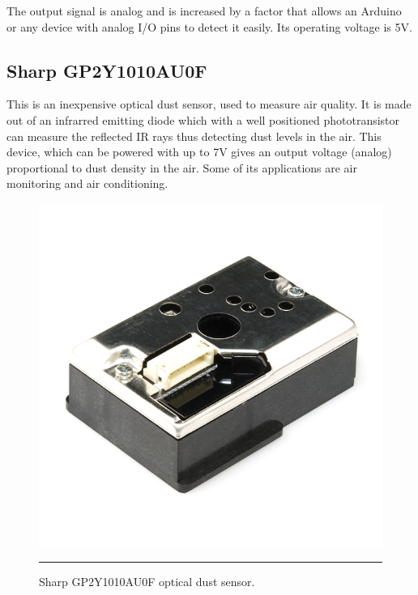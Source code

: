 The output signal is analog and is increased by a factor that allows an Arduino or any device with analog I/O pins to detect it easily\citep{gertz2012environmental}. Its operating voltage is 5V.



\subsection{Sharp GP2Y1010AU0F\citep{sharp}}

This is an inexpensive optical dust sensor, used to measure air quality. It is made out of an infrarred emitting diode which with a well positioned phototransistor can measure the reflected IR rays thus detecting dust levels in the air. This device, which can be powered with up to 7V gives an output voltage (analog) proportional to dust density in the air. Some of its applications are air monitoring and air conditioning.

\begin{figure}[htbp]
    \centering
        \includegraphics{./Figures/sharp.jpg}
        \rule{35em}{0.5pt}
    \caption[Sharp GP2Y1010AU0F]{Sharp GP2Y1010AU0F optical dust sensor.}
    \label{fig:SharpGP2Y1010AU0F}
\end{figure}

